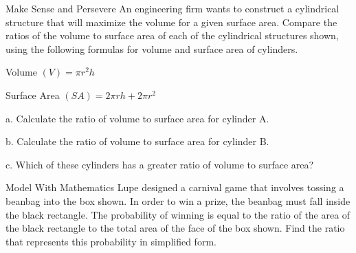 \documentclass{article}
\newenvironment{practice}[2]{}{}        %
\newcommand{\answer}[1]{}               %
\newcommand{\placeholder}[2]{}          %
\begin{document}
\begin{practice}{35}{1}
Make Sense and Persevere An engineering firm wants to construct a cylindrical structure that will maximize the volume for a given surface area. Compare the ratios of the volume to surface area of each of the cylindrical structures shown, using the following formulas for volume and surface area of cylinders.

Volume $(V)=\pi r^2h$

Surface Area $(SA)=2\pi rh+2\pi r^2$


a. Calculate the ratio of volume to surface area for cylinder A.

b. Calculate the ratio of volume to surface area for cylinder B.

c. Which of these cylinders has a greater ratio of volume to surface area?

\answer{a. $\frac{r}{3}$ b. $\frac{3r}{8}$ c. cylinder B}
\end{practice}

\begin{practice}{36}{2}
Model With Mathematics Lupe designed a carnival game that involves tossing a beanbag into the box shown. In order to win a prize, the beanbag must fall inside the black rectangle. The probability of winning is equal to the ratio of the area of the black rectangle to the total area of the face of the box shown. Find the ratio that represents this probability in simplified form.

\placeholder{illustration}{Carnival beanbag toss scene with a person tossing a beanbag toward a rectangular game board.}


\answer{The probability is $\frac{x}{6(x+1)}$.}
\end{practice}
\end{document}
